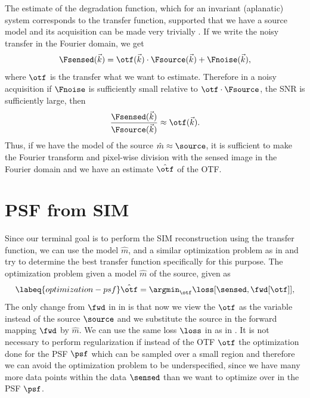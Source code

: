 The estimate of the degradation function, which for an invariant (aplanatic) system corresponds to the transfer 
    function, supported that we have a source model and its acquisition can be made very trivially 
    . 
If we write the noisy transfer in the Fourier domain, we get
    \begin{equation}
      \Fsensed(\vec{k}) = \otf(\vec{k}) \cdot \Fsource(\vec{k}) + \Fnoise(\vec{k}),
    \end{equation}
    where \(\otf\) is the transfer what we want to estimate.
Therefore in a noisy acquisition if \(\Fnoise\) is sufficiently small relative to \(\otf \cdot \Fsource\), the \ac{SNR} 
    is sufficiently large, then
    \begin{equation*}
        \frac{\Fsensed(\vec{k})}{\Fsource(\vec{k})} \approx \otf(\vec{k}).
    \end{equation*}
Thus, if we have the model of the source \(\hat{m} \approx \source\), it is sufficient to make the Fourier transform and 
    pixel-wise division with the sensed image in the Fourier domain and we have an estimate \(\hat{\otf}\) of the 
    \ac{OTF}.


\section{\ac{PSF} from \ac{SIM}}

Since our terminal goal is to perform the \ac{SIM} reconstruction using the transfer function, we can use the model
    \(\hat{m}\), and a similar optimization problem as in  and try to determine the
    best transfer function specifically for this purpose.
The optimization problem given a model \(\hat{m}\) of the source, given as
    \begin{equation}
        \labeq{optimization-psf}
        \hat{\otf} = \argmin_{\otf} \loss[\sensed,  \fwd[\otf]],
    \end{equation}
The only change from \(\fwd\) in  in  is that now we view the \(\otf\) as the variable
    instead of the source \(\source\) and we substitute the source in the forward mapping \(\fwd\) by \(\hat{m}\).
We can use the same loss \(\loss\) in  as in .
It is not necessary to perform regularization if instead of the \ac{OTF} \(\otf\) the optimization done for the \ac{PSF}
    \(\psf\) which can be sampled over a small region and therefore we can avoid the optimization problem to be
    underspecified, since we have many more data points within the data \(\sensed\) than we want to optimize over in the
    \ac{PSF} \(\psf\).

